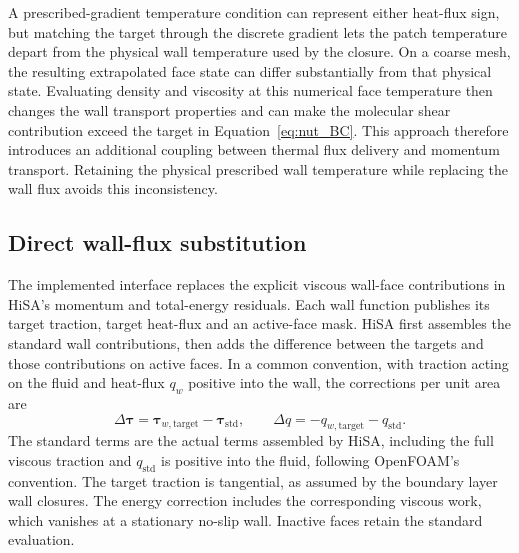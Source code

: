 A prescribed-gradient temperature condition can represent either heat-flux sign, but matching the target through the discrete gradient lets the patch temperature depart from the physical wall temperature used by the closure. On a coarse mesh, the resulting extrapolated face state can differ substantially from that physical state. Evaluating density and viscosity at this numerical face temperature then changes the wall transport properties and can make the molecular shear contribution exceed the target in Equation~\eqref{eq:nut_BC}. This approach therefore introduces an additional coupling between thermal flux delivery and momentum transport. Retaining the physical prescribed wall temperature while replacing the wall flux avoids this inconsistency.

\subsection{Direct wall-flux substitution}
\label{subsec:wall-functions:direct-flux-delivery}

The implemented interface replaces the explicit viscous wall-face contributions in HiSA's momentum and total-energy residuals. Each wall function publishes its target traction, target heat-flux and an active-face mask. HiSA first assembles the standard wall contributions, then adds the difference between the targets and those contributions on active faces. In a common convention, with traction acting on the fluid and heat-flux \(q_w\) positive into the wall, the corrections per unit area are
\begin{equation}
    \Delta\boldsymbol{\tau}
    =\boldsymbol{\tau}_{w,\mathrm{target}}-\boldsymbol{\tau}_{\mathrm{std}},
    \qquad
    \Delta q=-q_{w,\mathrm{target}}-q_{\mathrm{std}}.
    \label{eq:wall-functions:flux-substitution}
\end{equation}
The standard terms are the actual terms assembled by HiSA, including the full viscous traction and \(q_{\mathrm{std}}\) is positive into the fluid, following OpenFOAM's convention. The target traction is tangential, as assumed by the boundary layer wall closures. The energy correction includes the corresponding viscous work, which vanishes at a stationary no-slip wall. Inactive faces retain the standard evaluation.

